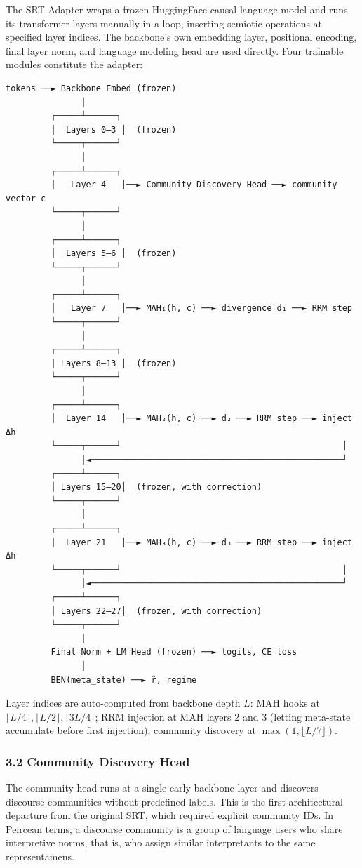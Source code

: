 \documentclass[
  11pt]{article}
\begin{document}
The SRT-Adapter wraps a frozen HuggingFace causal language model and
runs its transformer layers manually in a loop, inserting semiotic
operations at specified layer indices. The backbone's own embedding
layer, positional encoding, final layer norm, and language modeling head
are used directly. Four trainable modules constitute the adapter:

\begin{verbatim}
tokens ──► Backbone Embed (frozen)
               │
         ┌─────┴──────┐
         │  Layers 0–3 │  (frozen)
         └─────┬──────┘
               │
         ┌─────┴──────┐
         │   Layer 4   │──► Community Discovery Head ──► community vector c
         └─────┬──────┘
               │
         ┌─────┴──────┐
         │  Layers 5–6 │  (frozen)
         └─────┬──────┘
               │
         ┌─────┴──────┐
         │   Layer 7   │──► MAH₁(h, c) ──► divergence d₁ ──► RRM step
         └─────┬──────┘
               │
         ┌─────┴──────┐
         │ Layers 8–13 │  (frozen)
         └─────┬──────┘
               │
         ┌─────┴──────┐
         │  Layer 14   │──► MAH₂(h, c) ──► d₂ ──► RRM step ──► inject Δh
         └─────┬──────┘                                            │
               │◄──────────────────────────────────────────────────┘
         ┌─────┴──────┐
         │ Layers 15–20│  (frozen, with correction)
         └─────┬──────┘
               │
         ┌─────┴──────┐
         │  Layer 21   │──► MAH₃(h, c) ──► d₃ ──► RRM step ──► inject Δh
         └─────┬──────┘                                            │
               │◄──────────────────────────────────────────────────┘
         ┌─────┴──────┐
         │ Layers 22–27│  (frozen, with correction)
         └─────┬──────┘
               │
         Final Norm + LM Head (frozen) ──► logits, CE loss
               │
         BEN(meta_state) ──► r̂, regime
\end{verbatim}

Layer indices are auto-computed from backbone depth \(L\): MAH hooks at
\(\lfloor L/4 \rfloor, \lfloor L/2 \rfloor, \lfloor 3L/4 \rfloor\); RRM
injection at MAH layers 2 and 3 (letting meta-state accumulate before
first injection); community discovery at
\(\max(1, \lfloor L/7 \rfloor)\).

\subsubsection{3.2 Community Discovery
Head}\label{community-discovery-head}

The community head runs at a single early backbone layer and discovers
discourse communities without predefined labels. This is the first
architectural departure from the original SRT, which required explicit
community IDs. In Peircean terms, a discourse community is a group of
language users who share interpretive norms, that is, who assign similar
interpretants to the same representamens.
\end{document}
